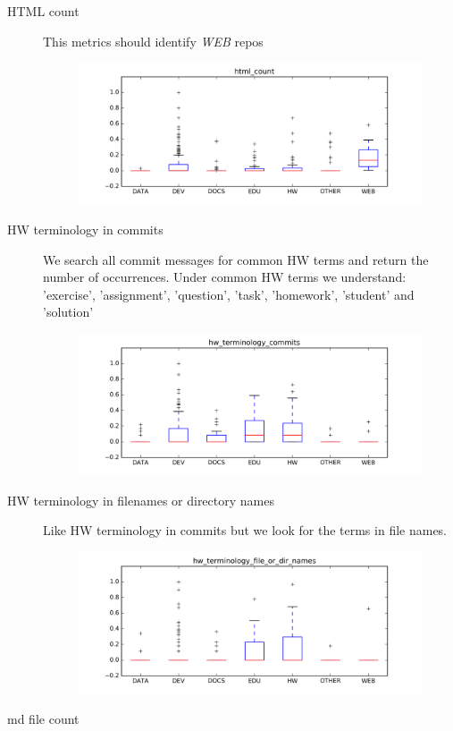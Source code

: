 \documentclass[a4paper]{scrartcl}
\begin{document}
\begin{description}
\begin{figure}[h!]
				\end{figure}
			\item[HTML count]
				This metrics should identify \emph{WEB} repos
				\begin{figure}[h!]
					\centering
					\includegraphics[width=0.75\linewidth]{figures/html_count.png}
				\end{figure}
			\item[HW terminology in commits]
				We search all commit messages for common HW terms and return the number of occurrences. Under common HW terms we understand: 'exercise', 'assignment', 'question', 'task', 'homework', 'student' and 'solution' 
				\begin{figure}[h!]
					\centering
					\includegraphics[width=0.75\linewidth]{figures/hw_terminology_commits.png}
				\end{figure}
			\item[HW terminology in filenames or directory names]
				Like HW terminology in commits but we look for the terms in file names.
				\begin{figure}[h!]
					\centering
					\includegraphics[width=0.75\linewidth]{figures/hw_terminology_file_or_dir_names.png}
				\end{figure}
			\item[md file count]

\end{description}
\end{document}
